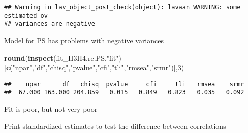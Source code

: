 \documentclass[
]{article}
\newenvironment{Shaded}{\begin{snugshade}}{\end{snugshade}}
\newcommand{\DecValTok}[1]{\textcolor[rgb]{0.00,0.00,0.81}{#1}}
\newcommand{\KeywordTok}[1]{\textcolor[rgb]{0.13,0.29,0.53}{\textbf{#1}}}
\newcommand{\NormalTok}[1]{#1}
\newcommand{\OperatorTok}[1]{\textcolor[rgb]{0.81,0.36,0.00}{\textbf{#1}}}
\newcommand{\StringTok}[1]{\textcolor[rgb]{0.31,0.60,0.02}{#1}}
\begin{document}
\begin{verbatim}
## Warning in lav_object_post_check(object): lavaan WARNING: some estimated ov
## variances are negative
\end{verbatim}

Model for PS has problems with negative variances

\begin{Shaded}
\begin{Highlighting}[]
\KeywordTok{round}\NormalTok{(}\KeywordTok{inspect}\NormalTok{(fit_H3H4.re.PS,}\StringTok{"fit"}\NormalTok{)}
\NormalTok{      [}\KeywordTok{c}\NormalTok{(}\StringTok{"npar"}\NormalTok{,}\StringTok{"df"}\NormalTok{,}\StringTok{"chisq"}\NormalTok{,}\StringTok{"pvalue"}\NormalTok{,}\StringTok{"cfi"}\NormalTok{,}\StringTok{"tli"}\NormalTok{,}\StringTok{"rmsea"}\NormalTok{,}\StringTok{"srmr"}\NormalTok{)],}\DecValTok{3}\NormalTok{)}
\end{Highlighting}
\end{Shaded}

\begin{verbatim}
##    npar      df   chisq  pvalue     cfi     tli   rmsea    srmr 
##  67.000 163.000 204.859   0.015   0.849   0.823   0.035   0.092
\end{verbatim}

Fit is poor, but not very poor

Print standardized estimates to test the difference between correlations

\begin{Shaded}
\end{Shaded}
\end{document}
